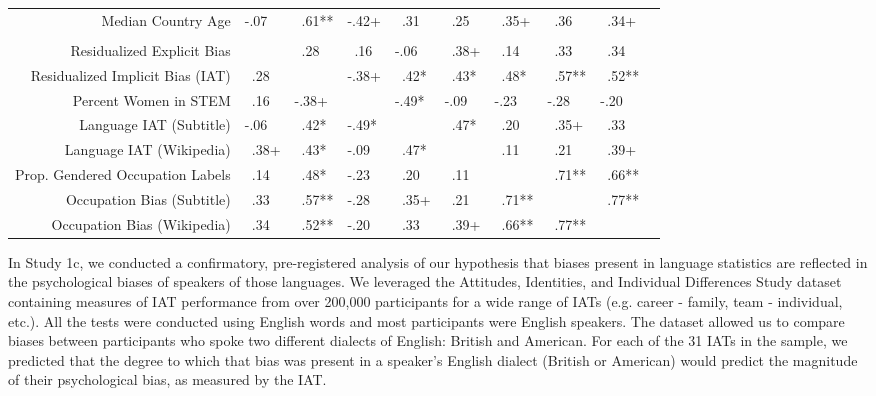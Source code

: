 \documentclass[9pt,twocolumn,twoside]{pnas-new}
\begin{document}
\begin{supertabular}{rlllllllll}
\hspace{1em}Median Country Age & -.07 & \ .61** & -.42+ & \ .31 & \ .25 & \ .35+ & \ .36 & \ .34+ & \\
\addlinespace[0.3em]
\\
\hspace{1em}Residualized Explicit Bias &  & \ .28 & \ .16 & -.06 & \ .38+ & \ .14 & \ .33 & \ .34 & \\
\hspace{1em}Residualized Implicit Bias (IAT) & \ .28 &  & -.38+ & \ .42* & \ .43* & \ .48* & \ .57** & \ .52** & \\
\hspace{1em}Percent Women in STEM & \ .16 & -.38+ &  & -.49* & -.09 & -.23 & -.28 & -.20 & \\
\hspace{1em}Language IAT (Subtitle) & -.06 & \ .42* & -.49* &  & \ .47* & \ .20 & \ .35+ & \ .33 & \\
\hspace{1em}Language IAT (Wikipedia) & \ .38+ & \ .43* & -.09 & \ .47* &  & \ .11 & \ .21 & \ .39+ & \\
\hspace{1em}Prop. Gendered Occupation Labels & \ .14 & \ .48* & -.23 & \ .20 & \ .11 &  & \ .71** & \ .66** & \\
\hspace{1em}Occupation Bias (Subtitle) & \ .33 & \ .57** & -.28 & \ .35+ & \ .21 & \ .71** &  & \ .77** & \\
\hspace{1em}Occupation Bias (Wikipedia) & \ .34 & \ .52** & -.20 & \ .33 & \ .39+ & \ .66** & \ .77** &  & \\
\bottomrule
\end{supertabular}

\endgroup{}

In Study 1c, we conducted a confirmatory, pre-registered analysis of our hypothesis that biases present in language statistics are reflected in the psychological biases of speakers of those languages. We leveraged the Attitudes, Identities, and Individual Differences Study dataset \cite[AIID]{aiid} containing measures of IAT performance from over 200,000 participants for a wide range of IATs (e.g. career - family, team - individual, etc.). All the tests were conducted using English words and most participants were English speakers. The dataset allowed us to compare biases between participants who spoke two different dialects of English: British and American. For each of the 31 IATs in the sample, we predicted that the degree to which that bias was present in a speaker’s English dialect (British or American) would predict the magnitude of their psychological bias, as measured by the IAT.
\end{document}
